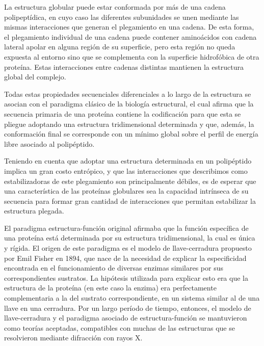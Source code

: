 La estructura globular puede estar conformada por más de una cadena polipeptídica, en cuyo caso las diferentes subunidades se unen mediante las mismas interacciones que generan el plegamiento en una cadena.
De esta forma, el plegamiento individual de una cadena puede contener aminoácidos con cadena lateral apolar en alguna región de su superficie, pero esta región no queda expuesta al entorno sino que se complementa 
con la superficie hidrofóbica de otra proteína. Estas interacciones entre cadenas distintas mantienen la estructura global del complejo.



Todas estas propiedades secuenciales diferenciales a lo largo de la estructura se asocian con el paradigma clásico de la biología estructural, el cual afirma que la secuencia primaria de una proteína 
contiene la codificación para que esta se pliegue adoptando una estructura tridimensional determinada y que, además, la conformación final se corresponde con un mínimo global sobre el perfil de energía libre asociado al polipéptido.  



Teniendo en cuenta que adoptar una estructura determinada en un polipéptido implica un gran costo entrópico, y que las interacciones que describimos como estabilizadoras de este plegamiento son principalmente débiles, 
es de esperar que una característica de las proteínas globulares sea la capacidad intrínseca de su secuencia para formar gran cantidad de interacciones que permitan estabilizar la estructura plegada.





El paradigma estructura-función original afirmaba que la función específica de una proteína está determinada por su estructura tridimensional, la cual es única y rígida. 
El origen de este paradigma es el modelo de llave-cerradura propuesto por Emil Fisher en 1894, 
que nace de la necesidad de explicar la especificidad encontrada en el funcionamiento de diversas enzimas similares por sus correspondientes sustratos. 
La hipótesis utilizada para explicar esto era que la estructura de la proteína (en este caso la enzima) era perfectamente complementaria a la del sustrato correspondiente, en un sistema similar al de una llave en una cerradura.
Por un largo período de tiempo, entonces, el modelo de llave-cerradura y el paradigma asociado de estructura-función se mantuvieron como teorías aceptadas, compatibles con muchas de las estructuras que se resolvieron mediante difracción con rayos X. 


